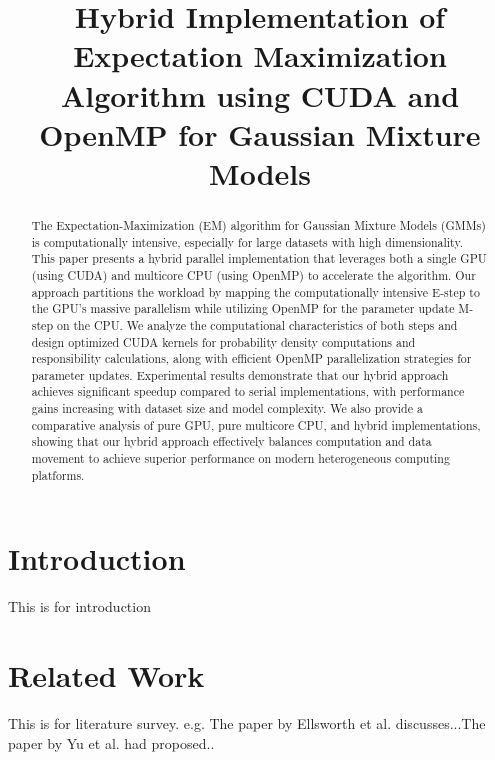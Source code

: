 \documentclass[conference]{IEEEtran}
\begin{document}
\title{Hybrid Implementation of Expectation Maximization Algorithm using CUDA and OpenMP for Gaussian Mixture Models}

\author{
}

\maketitle

\begin{abstract}
    The Expectation-Maximization (EM) algorithm for Gaussian Mixture Models (GMMs) is computationally intensive, especially for large datasets with high dimensionality. This paper presents a hybrid parallel implementation that leverages both a single GPU (using CUDA) and multicore CPU (using OpenMP) to accelerate the algorithm. Our approach partitions the workload by mapping the computationally intensive E-step to the GPU's massive parallelism while utilizing OpenMP for the parameter update M-step on the CPU. We analyze the computational characteristics of both steps and design optimized CUDA kernels for probability density computations and responsibility calculations, along with efficient OpenMP parallelization strategies for parameter updates. Experimental results demonstrate that our hybrid approach achieves significant speedup compared to serial implementations, with performance gains increasing with dataset size and model complexity. We also provide a comparative analysis of pure GPU, pure multicore CPU, and hybrid implementations, showing that our hybrid approach effectively balances computation and data movement to achieve superior performance on modern heterogeneous computing platforms.
\end{abstract}

\section{Introduction}
\label{intro}

This is for introduction

\section{Related Work}

This is for literature survey. e.g. The paper by Ellsworth et al.\cite{ellsworth-concurrentvis-tvcg2006} discusses...The paper by Yu et al.\cite{yu-parvis-sc2004} had proposed..
\end{document}
